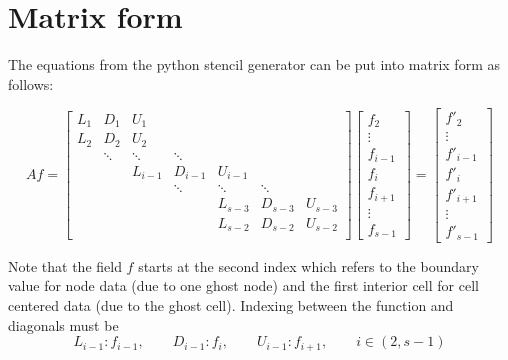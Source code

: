 \documentclass[landscape]{article}
\begin{document}
\doublespacing
\MOONSTITLE
\maketitle

\section{Matrix form}
The equations from the python stencil generator can be put into matrix form as follows:

\[ Af = \left[
\begin{array}{ccccccccc}
L_{1} & D_{1}    & U_{1}     &           &           &           &         \\
L_{2} & D_{2}    & U_{2}     &           &           &           &         \\
      & \ddots   & \ddots    & \ddots    &           &           &         \\
      &          & L_{i-1}   & D_{i-1}   & U_{i-1}   &           &         \\
      &          &           & \ddots    & \ddots    & \ddots    &         \\
      &          &           &           & L_{s-3}   & D_{s-3}   & U_{s-3} \\
      &          &           &           & L_{s-2}   & D_{s-2}   & U_{s-2} \\
\end{array} \right]
\left[ \begin{array}{c}
f_{2} \\ \vdots \\ f_{i-1} \\ f_{i} \\ f_{i+1} \\ \vdots \\ f_{s-1}
\end{array} \right]
=
\left[ \begin{array}{c}
f'_{2} \\ \vdots \\ f'_{i-1} \\ f'_{i} \\ f'_{i+1} \\ \vdots \\ f'_{s-1}
\end{array} \right]
\]

Note that the field $f$ starts at the second index which refers to the boundary value for node data (due to one ghost node) and the first interior cell for cell centered data (due to the ghost cell). Indexing between the function and diagonals must be
\begin{equation}
  L_{i-1} : f_{i-1}
  , \qquad
  D_{i-1} : f_{i}
  , \qquad
  U_{i-1} : f_{i+1}
  , \qquad
  i \in (2,s-1)
\end{equation}
\end{document}

